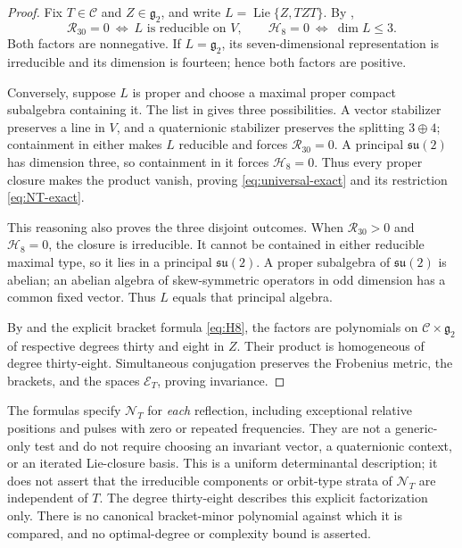 \documentclass[11pt,a4paper]{article}
\newcommand{\Lie}{\operatorname{Lie}}
\begin{document}
\begin{proof}
Fix $T\in\mathscr C$ and $Z\in\mathfrak g_2$, and write
$L=\Lie\{Z,TZT\}$.  By ,
\[
\mathcal R_{30}=0\ \Longleftrightarrow\ L\text{ is reducible on }V,
\qquad
\mathcal H_8=0\ \Longleftrightarrow\ \dim L\le3.
\]
Both factors are nonnegative.  If $L=\mathfrak g_2$, its seven-dimensional
representation is irreducible and its dimension is fourteen; hence both
factors are positive.

Conversely, suppose $L$ is proper and choose a maximal proper compact
subalgebra containing it.  The list in  gives
three possibilities.  A vector stabilizer preserves a line in $V$, and a
quaternionic stabilizer preserves the splitting $3\oplus4$; containment in
either makes $L$ reducible and forces $\mathcal R_{30}=0$.  A principal
$\mathfrak{su}(2)$ has dimension three, so containment in it forces
$\mathcal H_8=0$.  Thus every proper closure makes the product vanish,
proving \eqref{eq:universal-exact} and its restriction
\eqref{eq:NT-exact}.

This reasoning also proves the three disjoint outcomes.  When
$\mathcal R_{30}>0$ and $\mathcal H_8=0$, the closure is irreducible.  It cannot
be contained in either reducible maximal type, so it lies in a principal
$\mathfrak{su}(2)$.  A proper subalgebra of $\mathfrak{su}(2)$ is abelian;
an abelian algebra of skew-symmetric operators in odd dimension has a common
fixed vector.  Thus $L$ equals that principal algebra.

By  and the explicit bracket formula
\eqref{eq:H8}, the factors are polynomials on
$\mathscr C\times\mathfrak g_2$ of respective degrees thirty and eight in
$Z$.  Their product is homogeneous of degree thirty-eight.  Simultaneous
conjugation preserves the Frobenius metric, the brackets, and the spaces
$\mathscr E_T$, proving invariance.

\end{proof}

The formulas specify $\mathcal N_T$ for \emph{each} reflection, including exceptional relative positions and pulses with zero or repeated frequencies.  They are not a generic-only test and do not require choosing an invariant vector, a quaternionic context, or an iterated Lie-closure basis.  This is a uniform determinantal description; it does not assert that the irreducible components or orbit-type strata of $\mathcal N_T$ are independent of $T$.
The degree thirty-eight describes this explicit factorization only. There is no canonical bracket-minor polynomial against which it is compared, and no optimal-degree or complexity bound is asserted.
\end{document}

